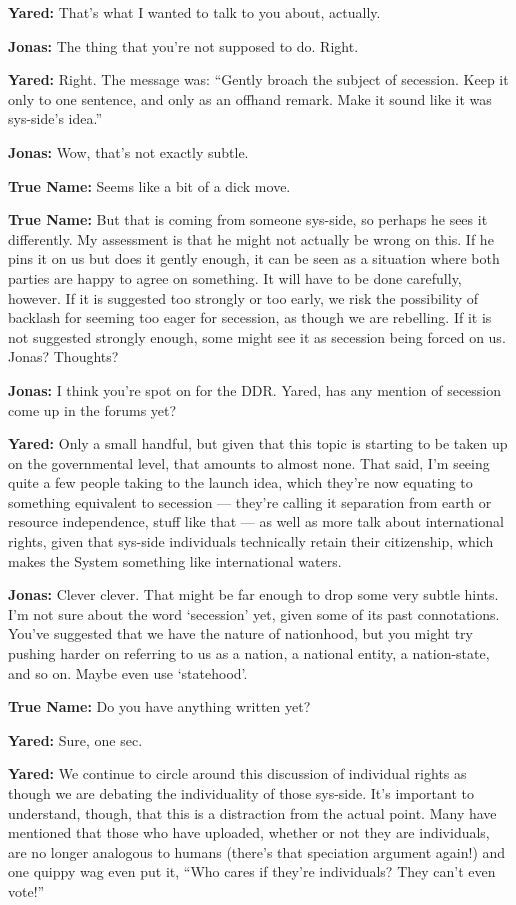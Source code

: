 \textbf{Yared:} That's what I wanted to talk to you about, actually.

\textbf{Jonas:} The thing that you're not supposed to do. Right.

\textbf{Yared:} Right. The message was: ``Gently broach the subject of secession. Keep it only to one sentence, and only as an offhand remark. Make it sound like it was sys-side's idea.''

\textbf{Jonas:} Wow, that's not exactly subtle.

\textbf{True Name:} Seems like a bit of a dick move.

\textbf{True Name:} But that is coming from someone sys-side, so perhaps he sees it differently. My assessment is that he might not actually be wrong on this. If he pins it on us but does it gently enough, it can be seen as a situation where both parties are happy to agree on something. It will have to be done carefully, however. If it is suggested too strongly or too early, we risk the possibility of backlash for seeming too eager for secession, as though we are rebelling. If it is not suggested strongly enough, some might see it as secession being forced on us. Jonas? Thoughts?

\textbf{Jonas:} I think you're spot on for the DDR. Yared, has any mention of secession come up in the forums yet?

\textbf{Yared:} Only a small handful, but given that this topic is starting to be taken up on the governmental level, that amounts to almost none. That said, I'm seeing quite a few people taking to the launch idea, which they're now equating to something equivalent to secession — they're calling it separation from earth or resource independence, stuff like that — as well as more talk about international rights, given that sys-side individuals technically retain their citizenship, which makes the System something like international waters.

\textbf{Jonas:} Clever clever. That might be far enough to drop some very subtle hints. I'm not sure about the word `secession' yet, given some of its past connotations. You've suggested that we have the nature of nationhood, but you might try pushing harder on referring to us as a nation, a national entity, a nation-state, and so on. Maybe even use `statehood'.

\textbf{True Name:} Do you have anything written yet?

\textbf{Yared:} Sure, one sec.

\textbf{Yared:} We continue to circle around this discussion of individual rights as though we are debating the individuality of those sys-side. It's important to understand, though, that this is a distraction from the actual point. Many have mentioned that those who have uploaded, whether or not they are individuals, are no longer analogous to humans (there's that speciation argument again!) and one quippy wag even put it, ``Who cares if they're individuals? They can't even vote!''

